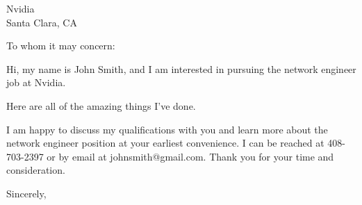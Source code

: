 \documentclass[11pt]{letter} %
\begin{document}

\begin{letter}{ Nvidia \\
Santa Clara, CA } 



\signature{John Smith} %


\opening{To whom it may concern:} 
 
Hi, my name is John Smith, and I am interested in pursuing the network engineer job at Nvidia.

Here are all of the amazing things I've done.

I am happy to discuss my qualifications with you and learn more about the network engineer 
position at your earliest convenience. I can be reached at 408-703-2397 or by email 
at johnsmith@gmail.com. Thank you for your time and consideration.

\closing{Sincerely,}




\end{letter}
\end{document}
